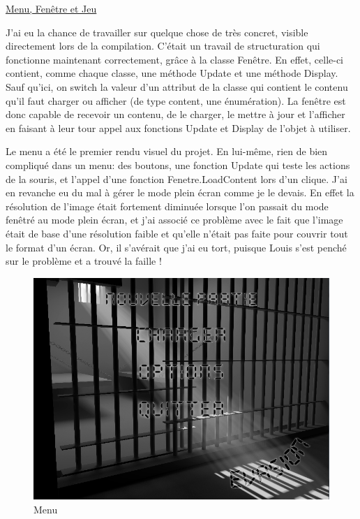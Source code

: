 \documentclass[12pt]{article}
\begin{document}
\underline {Menu, Fenêtre et Jeu}

\par
J'ai eu la chance de travailler sur quelque chose de très concret, visible directement lors de la compilation. C'était un travail de structuration qui fonctionne maintenant correctement, grâce à la classe Fenêtre. En effet, celle-ci contient, comme chaque classe, une méthode Update et une méthode Display. Sauf qu'ici, on switch la valeur d'un attribut de la classe qui contient le contenu qu'il faut charger ou afficher (de type content, une énumération). La fenêtre est donc capable de recevoir un contenu, de le charger, le mettre à jour et l'afficher en faisant à leur tour appel aux fonctions Update et Display de l'objet à utiliser.

\par
Le menu a été le premier rendu visuel du projet. En lui-même, rien de bien compliqué dans un menu: des boutons, une fonction Update qui teste les actions de la souris, et l'appel d'une fonction Fenetre.LoadContent lors d'un clique. J'ai en revanche eu du mal à gérer le mode plein écran comme je le devais. En effet la résolution de l'image était fortement diminuée lorsque l'on passait du mode fenêtré au mode plein écran, et j'ai associé ce problème avec le fait que l'image était de base d'une résolution faible et qu'elle n'était pas faite pour couvrir tout le format d'un écran. Or, il s'avérait que j'ai eu tort, puisque Louis s'est penché sur le problème et a trouvé la faille ! 
\begin{figure}
\begin{center}
\includegraphics[scale=0.5]{menu.jpg}
\caption{Menu}
\end{center}
\end{figure} 
\end{document}
